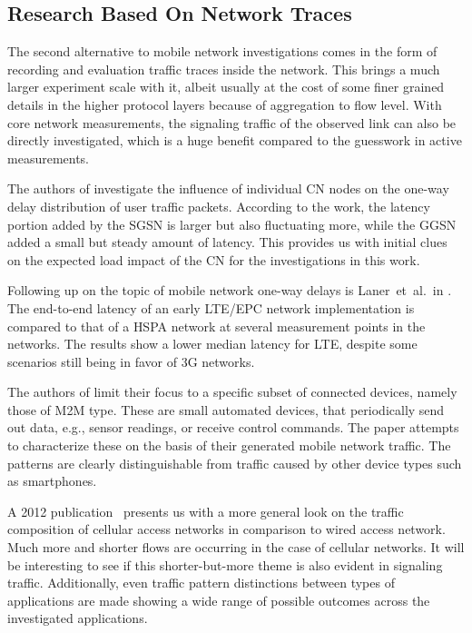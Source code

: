 \subsection{Research Based On Network Traces}

The second alternative to mobile network investigations comes in the form of recording and evaluation traffic traces inside the network. This brings a much larger experiment scale with it, albeit usually at the cost of some finer grained details in the higher protocol layers because of aggregation to flow level. With core network measurements, the signaling traffic of the observed link can also be directly investigated, which is a huge benefit compared to the guesswork in active measurements.

The authors of \cite{4675847} investigate the influence of individual \gls{CN} nodes on the one-way delay distribution of user traffic packets. According to the work, the latency portion added by the \gls{SGSN} is larger but also fluctuating more, while the \gls{GGSN} added a small but steady amount of latency. This provides us with initial clues on the expected load impact of the \gls{CN} for the investigations in this work.

Following up on the topic of mobile network one-way delays is Laner~et~al.\ in \cite{laner2012delaycomparison}. The end-to-end latency of an early \gls{LTE}/\gls{EPC} network implementation is compared to that of a \gls{HSPA} network at several measurement points in the networks. The results show a lower median latency for \gls{LTE}, despite some scenarios still being in favor of \gls{3G} networks.

The authors of \cite{Shafiq:2012:FLC:2254756.2254767} limit their focus to a specific subset of connected devices, namely those of \gls{M2M} type. These are small automated devices, that periodically send out data, e.g., sensor readings, or receive control commands. The paper attempts to characterize these on the basis of their generated mobile network traffic. The patterns are clearly distinguishable from traffic caused by other device types such as smartphones.

A 2012 publication~\cite{Zhang:2012:UCC:2377677.2377764} presents us with a more general look on the traffic composition of cellular access networks in comparison to wired access network. Much more and shorter flows are occurring in the case of cellular networks. It will be interesting to see if this shorter-but-more theme is also evident in signaling traffic. Additionally, even traffic pattern distinctions between types of applications are made showing a wide range of possible outcomes across the investigated applications.

